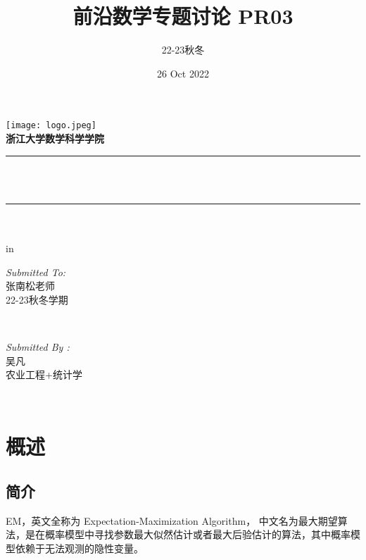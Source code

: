 \documentclass[12pt]{article}
\title{ 前沿数学专题讨论 PR03}								%
\author{22-23秋冬}								%
\date{26 Oct 2022}	%
\makeatletter
\let\thetitle\@title
\let\thedate\@date
\makeatother
\begin{document}

\begin{titlepage}
	\centering
    \vspace*{0.5 cm}
    \texttt{[image: logo.jpeg]}\\[1.0 cm]	%
	\textsc{\Large \textbf{浙江大学数学科学学院} }\\[0.5 cm]				%
	\rule{\linewidth}{0.2 mm} \\[0.4 cm]
	{ \huge \bfseries \thetitle}\\
	\rule{\linewidth}{0.2 mm} \\[1.5 cm]
	{  \bfseries \thedate}\\
	 in
	\begin{minipage}{0.4\textwidth}
		\begin{flushleft} \large
			\emph{Submitted To:}\\
			张南松老师\\
                22-23秋冬学期\\
			\end{flushleft}
			\end{minipage}~
			\begin{minipage}{0.4\textwidth}
            
			\begin{flushright} \large
			\emph{Submitted By :} \\
			吴凡\\
            农业工程+统计学\\
		\end{flushright}
        
	\end{minipage}\\[2 cm]		    
	
\end{titlepage}

\tableofcontents
\pagebreak


\section{概述}
\subsection{简介}
EM，英文全称为 Expectation-Maximization Algorithm，
中文名为最大期望算法，是在概率模型中寻找参数最大似然估计或者最大后验估计的算法，其中概率模型依赖于无法观测的隐性变量。
\end{document}
